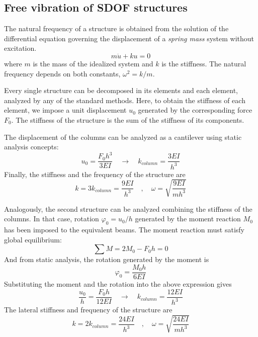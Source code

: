 \subsection{Free vibration of SDOF structures}


The natural frequency of a structure is obtained from the solution of the differential equation governing the displacement of a \emph{spring mass} system without excitation.
$$
m\ddot{u}+ku=0
$$
where $m$ is the mass of the idealized system and $k$ is the stiffness. The natural frequency depends on both constants, $\omega^2 = k/m$.

Every single structure can be decomposed in its elements and each element, analyzed by any of the standard methods. Here, to obtain the stiffness of each element, we impose a unit displacement $u_0$ generated by the corresponding force $F_0$. The stiffness of the structure is the sum of the stiffness of its components.

\begin{center}
\end{center}

The displacement of the columns can be analyzed as a cantilever using static analysis concepts:
$$
u_0 = \frac{F_0h^3}{3EI} \quad \rightarrow \quad k_{column} = \frac{3EI}{h^3}
$$
Finally, the stiffness and the frequency of the structure are
$$
k = 3k_{column} = \frac{9EI}{h^3} \quad , \quad \omega = \sqrt{\frac{9EI}{mh^3}}
$$

\begin{center}
\end{center}

Analogously, the second structure can be analyzed combining the stiffness of the columns. In that case, rotation $\varphi_0 = u_0/h$ generated by the moment reaction $M_0$ has been imposed to the equivalent beams. The moment reaction must satisfy global equilibrium:
$$
\sum M = 2M_0 -F_0h = 0
$$
And from static analysis, the rotation generated by the moment is
$$
\varphi_0 = \frac{M_0h}{6EI}
$$
Substituting the moment and the rotation into the above expression gives
$$
\frac{u_0}{h} = \frac{F_0h}{12EI} \quad \rightarrow \quad k_{column} = \frac{12EI}{h^3}
$$
The lateral stiffness and frequency of the structure are
$$
k = 2k_{column} = \frac{24EI}{h^3} \quad , \quad \omega = \sqrt{\frac{24EI}{mh^3}}
$$

\begin{center}
\end{center}

